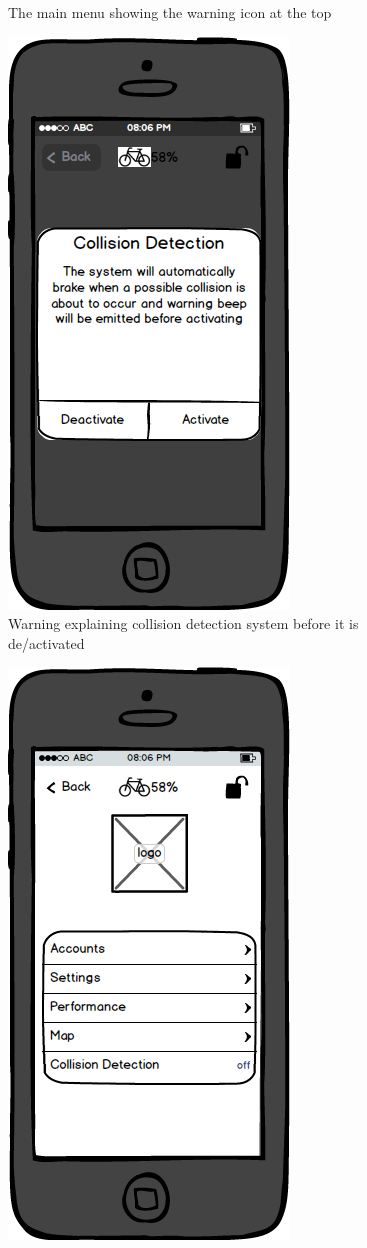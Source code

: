 \documentclass[a4paper]{report}
\begin{document}
{\begin{figure}
\caption{The main menu showing the warning icon at the top}
\end{figure}
\clearpage
\begin{figure}
\centering
\includegraphics[scale=0.8]{figures/prototype_2/collision_activate}
\caption{Warning explaining collision detection system before it is de/activated}
\end{figure}
\clearpage
\begin{figure}
\centering
\includegraphics[scale=0.9]{figures/prototype_2/main_collision}

\end{figure}}
\end{document}
